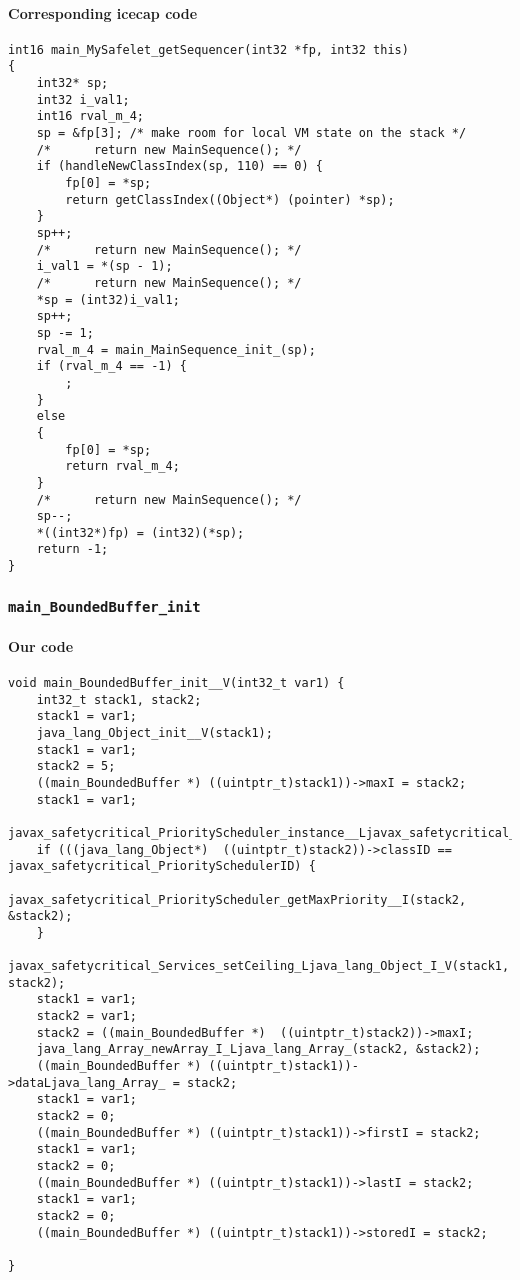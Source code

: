 \paragraph{Corresponding icecap code}\hfill
\begin{lstlisting}[firstnumber=56307]
int16 main_MySafelet_getSequencer(int32 *fp, int32 this)
{
	int32* sp;
	int32 i_val1;
	int16 rval_m_4;
	sp = &fp[3]; /* make room for local VM state on the stack */
	/*		return new MainSequence(); */
	if (handleNewClassIndex(sp, 110) == 0) {
		fp[0] = *sp;
		return getClassIndex((Object*) (pointer) *sp);
	}
	sp++;
	/*		return new MainSequence(); */
	i_val1 = *(sp - 1);
	/*		return new MainSequence(); */
	*sp = (int32)i_val1;
	sp++;
	sp -= 1;
	rval_m_4 = main_MainSequence_init_(sp);
	if (rval_m_4 == -1) {
		;
	}
	else
	{
		fp[0] = *sp;
		return rval_m_4;
	}
	/*		return new MainSequence(); */
	sp--;
	*((int32*)fp) = (int32)(*sp);
	return -1;
}
\end{lstlisting}

\subsubsection{\texttt{main\_BoundedBuffer\_init}}

\paragraph{Our code}\hfill
\begin{lstlisting}[firstnumber=1763]
void main_BoundedBuffer_init__V(int32_t var1) {
	int32_t stack1, stack2;
	stack1 = var1;
	java_lang_Object_init__V(stack1);
	stack1 = var1;
	stack2 = 5;
	((main_BoundedBuffer *) ((uintptr_t)stack1))->maxI = stack2;
	stack1 = var1;
	javax_safetycritical_PriorityScheduler_instance__Ljavax_safetycritical_PriorityScheduler_(&stack2);
	if (((java_lang_Object*)  ((uintptr_t)stack2))->classID == javax_safetycritical_PrioritySchedulerID) {
		javax_safetycritical_PriorityScheduler_getMaxPriority__I(stack2, &stack2);
	}
	javax_safetycritical_Services_setCeiling_Ljava_lang_Object_I_V(stack1, stack2);
	stack1 = var1;
	stack2 = var1;
	stack2 = ((main_BoundedBuffer *)  ((uintptr_t)stack2))->maxI;
	java_lang_Array_newArray_I_Ljava_lang_Array_(stack2, &stack2);
	((main_BoundedBuffer *) ((uintptr_t)stack1))->dataLjava_lang_Array_ = stack2;
	stack1 = var1;
	stack2 = 0;
	((main_BoundedBuffer *) ((uintptr_t)stack1))->firstI = stack2;
	stack1 = var1;
	stack2 = 0;
	((main_BoundedBuffer *) ((uintptr_t)stack1))->lastI = stack2;
	stack1 = var1;
	stack2 = 0;
	((main_BoundedBuffer *) ((uintptr_t)stack1))->storedI = stack2;

}
\end{lstlisting}

